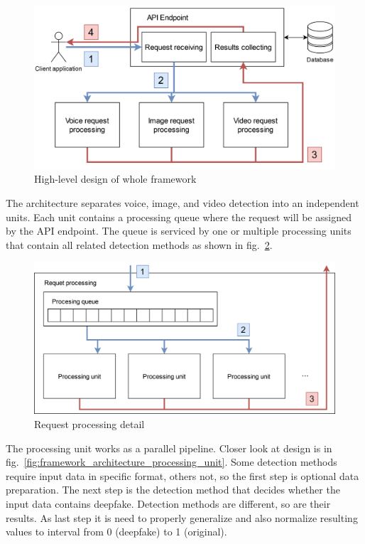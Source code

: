 \begin{figure}[H]
    \centering
    \includegraphics[width=.7\linewidth]{other-fig/framework_architecture.png}
    \caption{High-level design of whole framework}
    \label{fig:framework_architecture}
\end{figure}

The architecture separates voice, image, and video detection into an independent units. Each unit contains a processing queue where the request will be assigned by the API endpoint. The queue is serviced by one or multiple processing units that contain all related detection methods as shown in fig.~\ref{fig:framework_architecture_request_processing}.

\begin{figure}[H]
    \centering
    \includegraphics[width=.65\linewidth]{other-fig/framework_architecture_request_processing.png}
    \caption{Request processing detail}
    \label{fig:framework_architecture_request_processing}
\end{figure}

The processing unit works as a parallel pipeline. Closer look at design is in fig.~\ref{fig:framework_architecture_processing_unit}. Some detection methods require input data in specific format, others not, so the first step is optional data preparation. The next step is the detection method that decides whether the input data contains deepfake. Detection methods are different, so are their results. As last step it is need to properly generalize and also normalize resulting values to interval from 0 (deepfake) to 1 (original).

